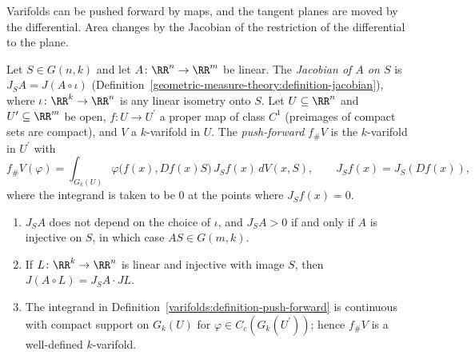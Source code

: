 Varifolds can be pushed forward by maps, and the tangent planes are moved by the differential. Area changes by the Jacobian of the restriction of the differential to the plane.

\begin{definition}\label{varifolds:definition-push-forward}
Let $S \in G(n, k)$ and let $A \colon \RR^n \to \RR^m$ be linear. The \emph{Jacobian of $A$ on $S$} is $J_SA = J(A \circ \iota)$ (Definition~\ref{geometric-measure-theory:definition-jacobian}), where
$\iota \colon \RR^k \to \RR^n$ is any linear isometry onto $S$. Let $U \subseteq \RR^n$ and $U^{\prime} \subseteq \RR^m$ be open, $f \colon U \to U^{\prime}$ a proper map of class $C^1$ (preimages of compact sets
are compact), and $V$ a $k$-varifold in $U$. The \emph{push-forward} $f_\#V$ is the $k$-varifold in $U^{\prime}$ with
\[
f_\#V(\varphi) = \int_{G_k(U)}\varphi\bigl(f(x), Df(x)S\bigr)\,J_Sf(x)\,dV(x, S), \qquad J_Sf(x) = J_S(Df(x)),
\]
where the integrand is taken to be $0$ at the points where $J_Sf(x) = 0$.
\end{definition}

\begin{lemma}\label{varifolds:lemma-push-forward}
\begin{enumerate}
\item $J_SA$ does not depend on the choice of $\iota$, and $J_SA > 0$ if and only if $A$ is injective on $S$, in which case $AS \in G(m, k)$.
\item If $L \colon \RR^k \to \RR^n$ is linear and injective with image $S$, then $J(A \circ L) = J_SA \cdot JL$.
\item The integrand in Definition~\ref{varifolds:definition-push-forward} is continuous with compact support on $G_k(U)$ for $\varphi \in C_c(G_k(U^{\prime}))$; hence $f_\#V$ is a well-defined $k$-varifold.
\end{enumerate}
\end{lemma}


